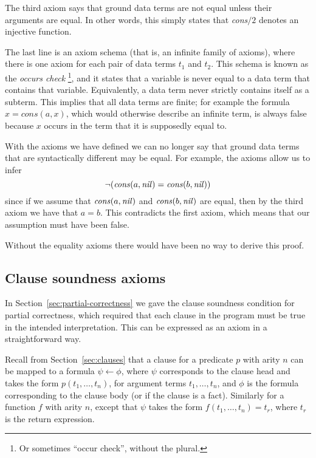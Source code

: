 The third axiom says that
ground data terms are not equal
unless their arguments are equal.
In other words,
this simply states that
\textit{cons}$/2$ denotes an injective function.

The last line is an axiom schema
(that is, an infinite family of axioms),
where there is one axiom for each pair of data terms $t_1$ and $t_2$.
This schema is known as the \emph{occurs check\label{gi:occurs-check}}%
\footnote{
Or sometimes ``occur check'', without the plural.
},
and it states that a variable is never equal to
a data term that contains that variable.
Equivalently,
a data term never strictly contains itself as a subterm.
This implies that all data terms are finite;
for example the formula $x = \mathit{cons}(a, x)$,
which would otherwise describe an infinite term,
is always false because $x$ occurs in the term
that it is supposedly equal to.

With the axioms we have defined
we can no longer say that
ground data terms that are syntactically different may be equal.
For example, the axioms allow us to infer
\[
\lnot (\text{\textit{cons}}(a, \text{\textit{nil}}) =
    \text{\textit{cons}}(b, \text{\textit{nil}}))
\]
since if we assume that
$\text{\textit{cons}}(a, \text{\textit{nil}})$
and
$\text{\textit{cons}}(b, \text{\textit{nil}})$
are equal,
then by the third axiom we have that $a = b$.
This contradicts the first axiom,
which means that our assumption must have been false.

Without the equality axioms there would have been
no way to derive this proof.


\subsection{Clause soundness axioms}
\label{sec:ax-clause-soundness}

In Section~\ref{sec:partial-correctness}
we gave the clause soundness condition
for partial correctness,
which required that each clause in the program
must be true in the intended interpretation.
This can be expressed as an axiom
in a straightforward way.

Recall from Section~\ref{sec:clauses}
that a clause for a predicate $p$ with arity $n$
can be mapped to a formula $\psi \leftarrow \phi$,
where $\psi$ corresponds to the clause head
and takes the form $p(t_1, \ldots, t_n)$,
for argument terms $t_1, \ldots, t_n$,
and $\phi$ is the formula corresponding to the clause body
(or  if the clause is a fact).
Similarly for a function $f$ with arity $n$,
except that $\psi$ takes the form $f(t_1, \ldots, t_n) = t_r$,
where $t_r$ is the return expression.

